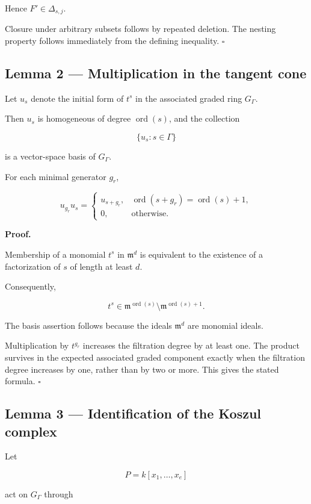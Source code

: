 \documentclass[11pt]{article}
\begin{document}
Hence \(F'\in\Delta_{s,j}\).

Closure under arbitrary subsets follows by repeated deletion. The nesting property follows immediately from the defining inequality. \(\square\)

\subsection{Lemma 2 --- Multiplication in the tangent cone}

Let \(u_s\) denote the initial form of \(t^s\) in the associated graded ring \(G_\Gamma\).

Then \(u_s\) is homogeneous of degree \(\operatorname{ord}(s)\), and the collection

\[
\{u_s:s\in\Gamma\}
\]

is a vector-space basis of \(G_\Gamma\).

For each minimal generator \(g_r\),

\[
u_{g_r}u_s=
\begin{cases}
u_{s+g_r},
&\operatorname{ord}(s+g_r)
=\operatorname{ord}(s)+1,\\
0,&\text{otherwise}.
\end{cases}
\]

\textbf{Proof.}

Membership of a monomial \(t^s\) in \(\mathfrak m^d\) is equivalent to the existence of a factorization of \(s\) of length at least \(d\).

Consequently,

\[
t^s\in
\mathfrak m^{\operatorname{ord}(s)}
\setminus
\mathfrak m^{\operatorname{ord}(s)+1}.
\]

The basis assertion follows because the ideals \(\mathfrak m^d\) are monomial ideals.

Multiplication by \(t^{g_r}\) increases the filtration degree by at least one. The product survives in the expected associated graded component exactly when the filtration degree increases by one, rather than by two or more. This gives the stated formula. \(\square\)

\subsection{Lemma 3 --- Identification of the Koszul complex}

Let

\[
P=k[x_1,\ldots,x_e]
\]

act on \(G_\Gamma\) through
\end{document}
